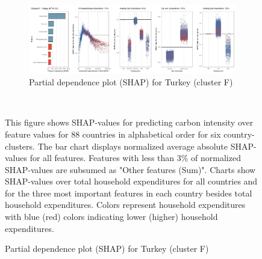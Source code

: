 \begin{figure}[ht!]\ContinuedFloat
    \centering
    \begin{subfigure}[t!]{\textwidth}     
    \centering
         \caption{Partial dependence plot (SHAP) for Turkey (cluster F)}
         \label{fig:5b_TUR}
         \includegraphics[width=\textwidth]{Figure 5b/Figure_5b_TUR}     
    \end{subfigure}
    \\
    \vspace{0.5cm}
    \begin{subcaption2}
     This figure shows SHAP-values for predicting carbon intensity over feature values for 88 countries in alphabetical order for six country-clusters. The bar chart displays normalized average absolute SHAP-values for all features. Features with less than 3\% of normalized SHAP-values are subsumed as "Other features (Sum)". Charts show SHAP-values over total household expenditures for all countries and for the three most important features in each country besides total household expenditures. Colors represent household expenditures with blue (red) colors indicating lower (higher) household expenditures.
     \end{subcaption2}
\end{figure}